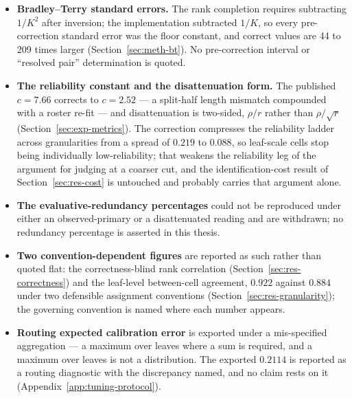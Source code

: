 \begin{itemize}

\item \textbf{Bradley--Terry standard errors.} The rank completion
requires subtracting $1/K^2$ after inversion; the implementation
subtracted $1/K$, so every pre-correction standard error was the floor
constant, and correct values are 44 to 209 times larger
(Section~\ref{sec:meth-bt}). No pre-correction interval or ``resolved
pair'' determination is quoted.

\item \textbf{The reliability constant and the disattenuation form.}
The published $c = 7.66$ corrects to $c = 2.52$ --- a split-half
length mismatch compounded with a roster re-fit --- and disattenuation
is two-sided, $\rho / r$ rather than $\rho / \sqrt{r}$
(Section~\ref{sec:exp-metrics}). The correction compresses the
reliability ladder across granularities from a spread of $0.219$ to
$0.088$, so leaf-scale cells stop being individually low-reliability;
that weakens the reliability leg of the argument for judging at a
coarser cut, and the identification-cost result of
Section~\ref{sec:res-cost} is untouched and probably carries that
argument alone.

\item \textbf{The evaluative-redundancy percentages} could not be
reproduced under either an observed-primary or a disattenuated
reading and are withdrawn; no redundancy percentage is asserted in
this thesis.

\item \textbf{Two convention-dependent figures} are reported as such
rather than quoted flat: the correctness-blind rank correlation
(Section~\ref{sec:res-correctness}) and the leaf-level between-cell
agreement, $0.922$ against $0.884$ under two defensible assignment
conventions (Section~\ref{sec:res-granularity}); the governing
convention is named where each number appears.

\item \textbf{Routing expected calibration error} is exported under a
mis-specified aggregation --- a maximum over leaves where a sum is
required, and a maximum over leaves is not a distribution. The
exported $0.2114$ is reported as a routing diagnostic with the
discrepancy named, and no claim rests on it
(Appendix~\ref{app:tuning-protocol}).

\end{itemize}


